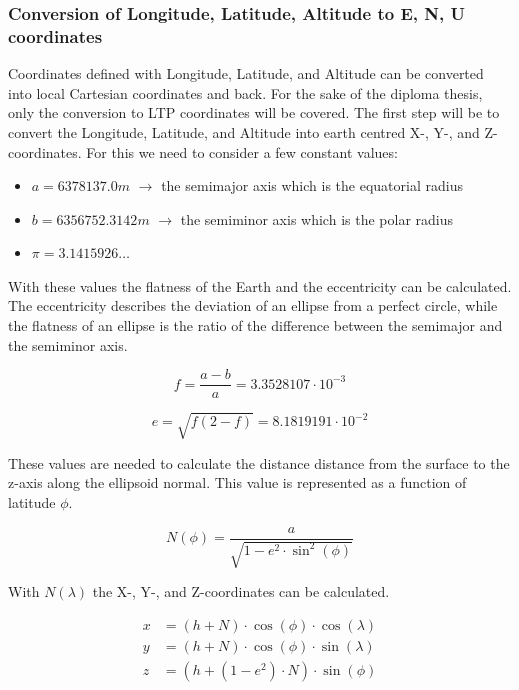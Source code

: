 \subsubsection{Conversion of Longitude, Latitude, Altitude to E, N, U coordinates}

Coordinates defined with Longitude, Latitude, and Altitude can be converted into local Cartesian coordinates and back. For the sake of the diploma thesis, only the conversion to LTP coordinates will be covered. 
The first step will be to convert the Longitude, Latitude, and Altitude into earth centred X-, Y-, and Z-coordinates. For this we need to consider a few constant values:

\begin{itemize}
    \item $a = 6378137.0 m$ $\xrightarrow{}$ the semimajor axis which is the equatorial radius
    \item $b = 6356752.3142 m$ $\xrightarrow{}$ the semiminor axis which is the polar radius
    \item $\pi = 3.1415926\dots$ 
\end{itemize}
\noindent\cite{Web:65}

With these values the flatness of the Earth and the eccentricity can be calculated. The eccentricity describes the deviation of an ellipse from a perfect circle, while the flatness of an ellipse is the ratio of the difference between the semimajor and the semiminor axis.

\[
f = \frac{a-b}{a} = 3.3528107\cdot 10^{-3}
\]

\[
e = \sqrt{f(2-f)} = 8.1819191 \cdot 10^{-2}
\]

\noindent\cite{Web:65}

These values are needed to calculate the distance distance from the surface to the z-axis along the ellipsoid normal. This value is represented as a function of latitude $\phi$.

\[
N(\phi) = \frac{a}{\sqrt{1-e^2 \cdot \sin^2(\phi)}} 
\]

With $N(\lambda)$ the X-, Y-, and Z-coordinates can be calculated.

\[
\begin{aligned}
x &= (h+N) \cdot \cos(\phi) \cdot \cos(\lambda)\\
y &= (h+N) \cdot \cos(\phi) \cdot \sin(\lambda)\\
z &= (h + (1-e^2) \cdot N) \cdot \sin(\phi) 
\end{aligned}
\]
\noindent\cite{Web:65}
 

